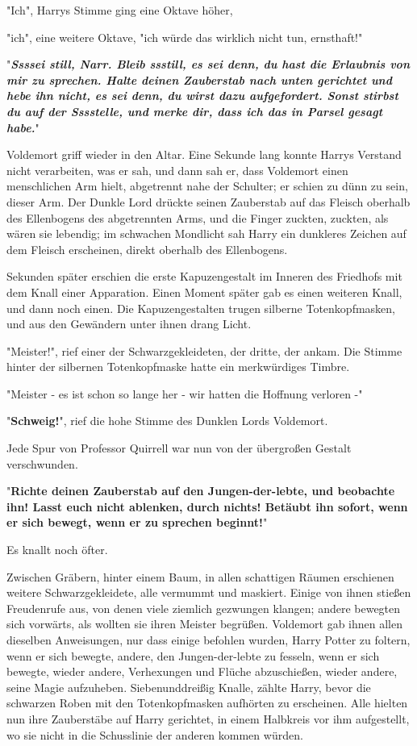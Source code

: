 {"Ich", Harrys Stimme ging eine Oktave höher,

"ich", eine weitere Oktave, "ich würde das wirklich nicht tun, ernsthaft!"

"\textbf{\emph{Ssssei still, Narr. Bleib ssstill, es sei denn, du hast die Erlaubnis von mir zu sprechen. Halte deinen Zauberstab nach unten gerichtet und hebe ihn nicht, es sei denn, du wirst dazu aufgefordert. Sonst stirbst du auf der Sssstelle, und merke dir, dass ich das in Parsel gesagt habe.}}"

Voldemort griff wieder in den Altar. Eine Sekunde lang konnte Harrys Verstand nicht verarbeiten, was er sah, und dann sah er, dass Voldemort einen menschlichen Arm hielt, abgetrennt nahe der Schulter; er schien zu dünn zu sein, dieser Arm. Der Dunkle Lord drückte seinen Zauberstab auf das Fleisch oberhalb des Ellenbogens des abgetrennten Arms, und die Finger zuckten, zuckten, als wären sie lebendig; im schwachen Mondlicht sah Harry ein dunkleres Zeichen auf dem Fleisch erscheinen, direkt oberhalb des Ellenbogens.

Sekunden später erschien die erste Kapuzengestalt im Inneren des Friedhofs mit dem Knall einer Apparation. Einen Moment später gab es einen weiteren Knall, und dann noch einen. Die Kapuzengestalten trugen silberne Totenkopfmasken, und aus den Gewändern unter ihnen drang Licht.

"Meister!", rief einer der Schwarzgekleideten, der dritte, der ankam. Die Stimme hinter der silbernen Totenkopfmaske hatte ein merkwürdiges Timbre.

"Meister - es ist schon so lange her - wir hatten die Hoffnung verloren -"

"\textbf{Schweig!}", rief die hohe Stimme des Dunklen Lords Voldemort.

Jede Spur von Professor Quirrell war nun von der übergroßen Gestalt verschwunden.

"\textbf{Richte deinen Zauberstab auf den Jungen-der-lebte, und beobachte ihn! Lasst euch nicht ablenken, durch nichts! Betäubt ihn sofort, wenn er sich bewegt, wenn er zu sprechen beginnt!}"

Es knallt noch öfter.

Zwischen Gräbern, hinter einem Baum, in allen schattigen Räumen erschienen weitere Schwarzgekleidete, alle vermummt und maskiert. Einige von ihnen stießen Freudenrufe aus, von denen viele ziemlich gezwungen klangen; andere bewegten sich vorwärts, als wollten sie ihren Meister begrüßen. Voldemort gab ihnen allen dieselben Anweisungen, nur dass einige befohlen wurden, Harry Potter zu foltern, wenn er sich bewegte, andere, den Jungen-der-lebte zu fesseln, wenn er sich bewegte, wieder andere, Verhexungen und Flüche abzuschießen, wieder andere, seine Magie aufzuheben. Siebenunddreißig Knalle, zählte Harry, bevor die schwarzen Roben mit den Totenkopfmasken aufhörten zu erscheinen. Alle hielten nun ihre Zauberstäbe auf Harry gerichtet, in einem Halbkreis vor ihm aufgestellt, wo sie nicht in die Schusslinie der anderen kommen würden.

}
